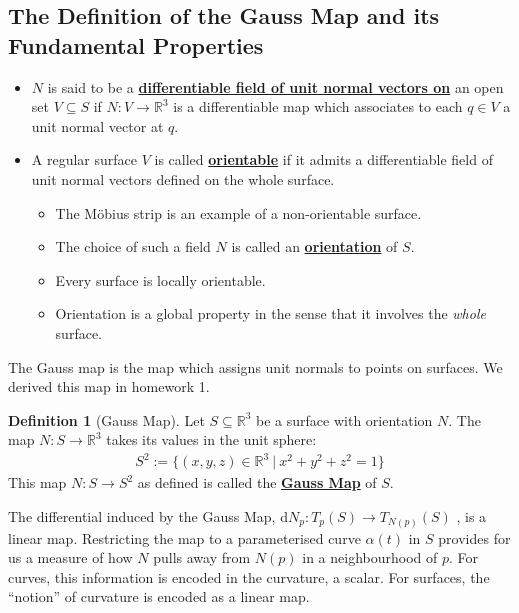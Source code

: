 \documentclass[11pt]{scrartcl}
\newcommand{\R}[0]{\mathbb{R}}
\theoremstyle{definition}
\newtheorem{definition}{Definition}
\theoremstyle{remark}
\newcommand{\dfn}[1]{\textbf{\underline{#1}}}
\begin{document}
{\subsection{The Definition of the Gauss Map and its Fundamental Properties}

\begin{itemize}[noitemsep]
	\item $N$ is said to be a \dfn{differentiable field of unit normal vectors on} an open set $V \subseteq S$ if $N: V \rightarrow \R^3$ is a differentiable map which associates to each $q \in V$ a unit normal vector at $q$. 
	\item A regular surface $V$ is called \dfn{orientable} if it admits a differentiable field of unit normal vectors defined on the whole surface. 
	\begin{itemize}[noitemsep]
		\item The Möbius strip is an example of a non-orientable surface. 
		\item The choice of such a field $N$ is called an \dfn{orientation} of $S$. 
		\item Every surface is locally orientable. 
		\item Orientation is a global property in the sense that it involves the \emph{whole} surface. 
	\end{itemize}
\end{itemize}

The Gauss map is the map which assigns unit normals to points on surfaces. We derived this map in homework 1. 

\begin{definition}[Gauss Map] 
	Let $S \subseteq \R^3$ be a surface with orientation $N$. The map $N: S \rightarrow \R^3$ takes its values in the unit sphere: 
	\begin{align}
		S^2 := \{ (x,y,z) \in \R^3\ |\ x^2 + y^2 + z^2 = 1 \} 	
	\end{align}
	This map $N: S \rightarrow S^2$ as defined is called the \dfn{Gauss Map} of $S$. 
\end{definition}
The differential induced by the Gauss Map, d$N_p: T_p(S) \rightarrow T_{N(p)}(S)$ , is a linear map. Restricting the map to a parameterised curve $\alpha(t)$ in $S$ provides for us a measure of how $N$ pulls away from $N(p)$ in a neighbourhood of $p$. For curves, this information is encoded in the curvature, a scalar. For surfaces, the ``notion'' of curvature is encoded as a linear map. 

}
\end{document}
